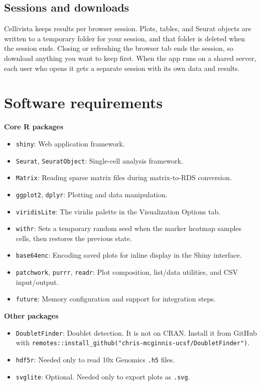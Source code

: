 \documentclass[11pt]{article}
\begin{document}
\subsection*{Sessions and downloads}
Cellivista keeps results per browser session. Plots, tables, and Seurat objects are written to a temporary folder for your session, and that folder is deleted when the session ends. Closing or refreshing the browser tab ends the session, so download anything you want to keep first. When the app runs on a shared server, each user who opens it gets a separate session with its own data and results.

\section{Software requirements}
\textbf{Core R packages}
\begin{itemize}
  \item \texttt{shiny}: Web application framework.
  \item \texttt{Seurat}, \texttt{SeuratObject}: Single-cell analysis framework.
  \item \texttt{Matrix}: Reading sparse matrix files during matrix-to-RDS conversion.
  \item \texttt{ggplot2}, \texttt{dplyr}: Plotting and data manipulation.
  \item \texttt{viridisLite}: The viridis palette in the Visualization Options tab.
  \item \texttt{withr}: Sets a temporary random seed when the marker heatmap samples cells, then restores the previous state.
  \item \texttt{base64enc}: Encoding saved plots for inline display in the Shiny interface.
  \item \texttt{patchwork}, \texttt{purrr}, \texttt{readr}: Plot composition, list/data utilities, and CSV input/output.
  \item \texttt{future}: Memory configuration and support for integration steps.
\end{itemize}

\textbf{Other packages}
\begin{itemize}
  \item \texttt{DoubletFinder}: Doublet detection. It is not on CRAN. Install it from GitHub with \texttt{remotes::install\_github("chris-mcginnis-ucsf/DoubletFinder")}.
  \item \texttt{hdf5r}: Needed only to read 10x Genomics \texttt{.h5} files.
  \item \texttt{svglite}: Optional. Needed only to export plots as \texttt{.svg}.
\end{itemize}
\end{document}
